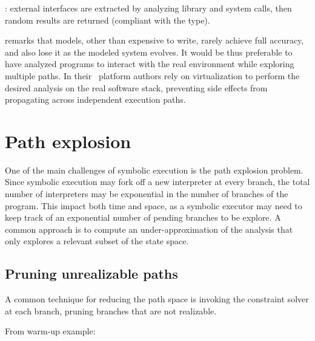 \cite{DART-PLDI05}: external interfaces are extracted by analyzing library and system calls, then random results are returned (compliant with the type).

\cite{CKC-TOCS12} remarks that models, other than expensive to write, rarely achieve full accuracy, and also lose it as the modeled system evolves. It would be thus preferable to have analyzed programs to interact with the real environment while exploring multiple paths. In their \stwoe\ platform authors rely on virtualization to perform the desired analysis on the real software stack, preventing side effects from propagating across independent execution paths. 


\section{Path explosion}

One of the main challenges of symbolic execution is the path explosion problem. Since symbolic execution may fork off a new interpreter at every branch, the total number of interpreters may be exponential in the number of branches of the program. This impact both time and space, as a symbolic executor may need to keep track of an exponential number of pending branches to be explore. A common approach is to compute an under-approximation of the analysis that only explores a relevant subset of the state space.

\subsection{Pruning unrealizable paths}

A common technique for reducing the path space is invoking the constraint solver at each branch, pruning branches that are not realizable. 

From warm-up example:

